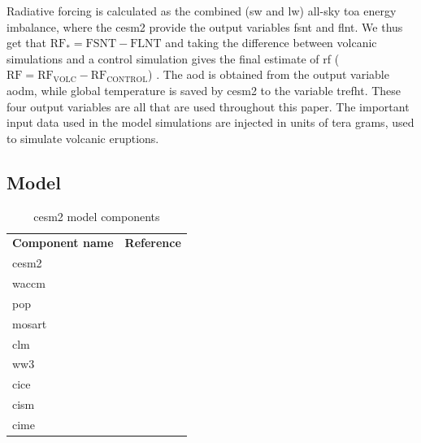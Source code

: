\documentclass{ametsocV5}
\newcommand{\iso}[1][i]{{#1}njected \ce{SO2}}
\begin{document}

Radiative forcing is calculated as the combined (\acrshort{sw} and \acrshort{lw})
all-sky \acrshort{toa} energy imbalance, where the \acrshort{cesm2} provide the output
variables \acrfull{fsnt} and \acrfull{flnt}. We thus get that \(\mathrm{RF_*}=
\mathrm{FSNT} - \mathrm{FLNT}\) and taking the difference between volcanic simulations
and a control simulation gives the final estimate of \acrshort{rf}
(\(\mathrm{RF}=\mathrm{RF_{VOLC}}-\mathrm{RF_{CONTROL}}\)) \citep{marshall2020}. The
\acrshort{aod} is obtained from the output variable \acrfull{aodm}, while global
temperature is saved by \acrshort{cesm2} to the variable \acrfull{trefht}. These four
output variables are all that are used throughout this paper. The important input data
used in the model simulations are \iso{} in units of tera grams, used to simulate
volcanic eruptions.

\subsection{Model}

\begin{table}
  \caption{\acrshort{cesm2} model components}%
  \label{tab:cesm-components}
  \begin{center}
    \begin{tabular}[c]{ll}
      \multicolumn{1}{c}{\textbf{Component name}} &
      \multicolumn{1}{c}{\textbf{Reference}}                                              \\
      \acrlong{cesm2}                             & \citet{danabasoglu2020}               \\
      \acrlong{waccm}                             & \citet{gettleman2019}                 \\
      \acrlong{pop}                               & \citet{smith2010, danabasoglu2020}    \\
      \acrlong{mosart}                            & \citet{li2013, danabasoglu2020}       \\
      \acrlong{clm}                               & \citet{lawrence2019, danabasoglu2020} \\
      \acrlong{ww3}                               & \citet{danabasoglu2020}               \\
      \acrlong{cice}                              & \citet{danabasoglu2020}               \\
      \acrlong{cism}                              & \citet{danabasoglu2020}               \\
      \acrlong{cime}                              & \citet{danabasoglu2020}
    \end{tabular}
  \end{center}
\end{table}
\end{document}
